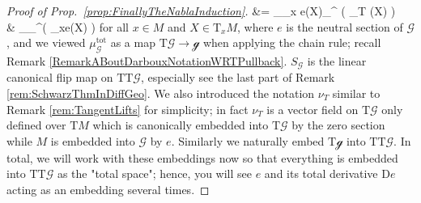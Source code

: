 \documentclass[a4paper,oneside,11pt,bibliography=totoc]{scrartcl}
\theoremstyle{plain}
\theoremstyle{remark}
\theoremstyle{definition}
\begin{document}
\begin{proof}[Proof of Prop.\ \ref{prop:FinallyTheNablaInduction}]
&=
_{_x e(X)}\mu_{}^{} \bigl( \nu_T (X) \bigr) 
\\
&\in
{}_{\mu_{}^{}\mleft( _xe(X) \mright) }
\nonumber
\ea
for all $x \in M$ and $X \in \mathrm{T}_xM$, where $e$ is the neutral section of $\mathcal{G}$, and we viewed $\mu_{\mathcal{G}}^{\mathrm{tot}}$ as a map $\mathrm{T}\mathcal{G} \to \mathcal{g}$ when applying the chain rule; recall Remark \ref{RemarkABoutDarbouxNotationWRTPullback}. $S_{\mathcal{G}}$ is the linear canonical flip map on $\mathrm{TT}\mathcal{G}$, especially see the last part of Remark \ref{rem:SchwarzThmInDiffGeo}. We also introduced the notation $\nu_T$ similar to Remark \ref{rem:TangentLifts} for simplicity; in fact $\nu_T$ is a vector field on $\mathrm{T}\mathcal{G}$ only defined over $\mathrm{T}M$ which is canonically embedded into $\mathrm{T}\mathcal{G}$ by the zero section while $M$ is embedded into $\mathcal{G}$ by $e$. Similarly we naturally embed $\mathrm{T}\mathcal{g}$ into $\mathrm{TT}\mathcal{G}$. In total, we will work with these embeddings now so that everything is embedded into $\mathrm{TT}\mathcal{G}$ as the "total space"; hence, you will see $e$ and its total derivative $\mathrm{D}e$ acting as an embedding several times.


\end{proof}
\end{document}
